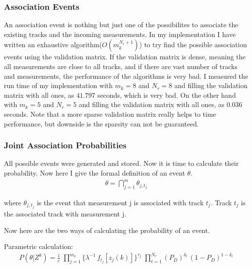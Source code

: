 \documentclass[peerreview]{IEEEtran}
\begin{document}
\vspace{10px}

\subsubsection{Association Events}
An association event is nothing but just one of the possibilites to associate the existing tracks and the incoming measurements. In my implementation I have written an exhaustive algorithm($O(m_k^{N_r+1})$) to try find the possible association events using the validation matrix. If the validation matrix is dense, meaning the all measurements are close to all tracks, and if there are vast number of tracks and measurements, the performance of the algorithms is very bad. I measured the run time of my implementation with $m_k = 8$ and $N_r = 8$ and filling the validation matrix with all ones, as $41.797$ seconds, which is very bad. On the other hand with $m_k = 5$ and $N_r = 5$ and filling the validation matrix with all ones, as $0.036$ seconds. Note that a more sparse validation matrix really helps to time performance, but downside is the sparsity can not be guaranteed.

\vspace{10px}

\subsubsection{Joint Association Probabilities}
All possible events were generated and stored. Now it is time to calculate their probability. Now here I give the formal definition of an event ${\theta}$.
\begin{equation}
\begin{aligned}
\theta = \bigcap\limits_{j=1}^m \theta_{j,t_j}
\end{aligned}
\end{equation}

where $\theta_{j,t_j}$ is the event that measurement j is associated with track $t_j$. Track $t_j$ is the associated track with measurement j.

Now here are the two ways of calculating the probability of an event.
\vspace{5px}

Parametric calculation:
\begin{equation}
\begin{aligned}
P(\theta|Z^k) = \frac{1}{c} \; \prod\limits_{j=1}^{m_k} \{ \lambda^{-1} \, f_{t_j}[z_j(k)] \} ^{\tau_j} \; \prod\limits_{t=1}^{N_r} (P_D)^{\delta_t} \, (1-P_D)^{1-\delta_t}
\end{aligned}
\end{equation}
\end{document}

